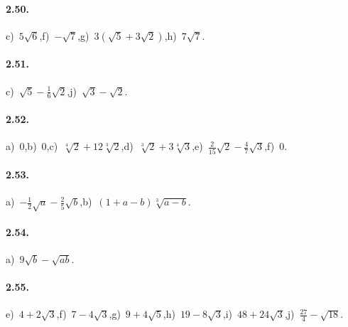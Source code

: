\paragraph{2.50.}
c)~$5\sqrt 6$,\quad f)~$-\sqrt 7$,\quad g)~$3(\sqrt 5+3\sqrt 2)$,\quad h)~$7\sqrt 7$.

\paragraph{2.51.}
c)~$\sqrt 5-\frac 1 6\sqrt 2$,\quad j)~$\sqrt 3-\sqrt 2$.

\paragraph{2.52.}
a)~$0$,\quad b)~$0$,\quad c)~$\sqrt[4]2+12\sqrt[3]2$,\quad d)~$\sqrt[3]2+3\sqrt[4]3$,\quad e)~$\frac 2{15}\sqrt 2-\frac 4 7\sqrt 3$,\quad f)~$0$.

\paragraph{2.53.}
a)~$-\frac 1 2\sqrt a-\frac 2 5\sqrt b$,\quad b)~$(1+a-b)\sqrt[3]{a-b}$.

\paragraph{2.54.}
a)~$9\sqrt b-\sqrt{ab}$.

\paragraph{2.55.}
e)~$4+2\sqrt 3$,\quad f)~$7-4\sqrt 3$,\quad g)~$9+4\sqrt 5$,\quad h)~$19-8\sqrt 3$,\quad i)~$48+24\sqrt 3$,\quad j)~$\frac{27} 4-\sqrt{18}$.


